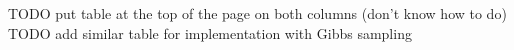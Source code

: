 \documentclass{article}
\begin{document}
TODO put table at the top of the page on both columns (don't know how to do) \\
TODO add similar table for implementation with Gibbs sampling

\nocite{blei2012probabilistic}



\end{document}
